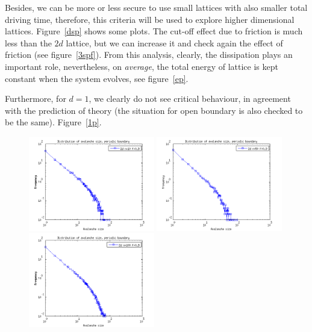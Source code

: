 Besides, we can be more or less secure to use small lattices with also smaller total driving time, therefore, 
this criteria will be used to explore higher dimensional lattices.
Figure~\ref{dsp} shows some plots. The cut-off effect due to friction is much less than the $2d$ lattice, 
but we can increase it and check again the effect of friction (see figure~\ref{3spf}).
From this analysis, clearly, the dissipation plays an important role, nevertheless, on \emph{average}, 
the total energy of lattice is kept constant when the system evolves, see figure~\ref{ep}. 

Furthermore, for $d=1$, we clearly do not see critical behaviour, in agreement with the prediction of theory (the situation for open boundary is also checked to be the same). Figure~\ref{1p}. 

\begin{figure} 
\begin{center}
\includegraphics[width=0.49\textwidth]{results/spf.png}
\includegraphics[width=0.49\textwidth]{results/spf50.png} \\
\includegraphics[width=0.49\textwidth]{results/spf100.png} 

\end{center}
\end{figure}
